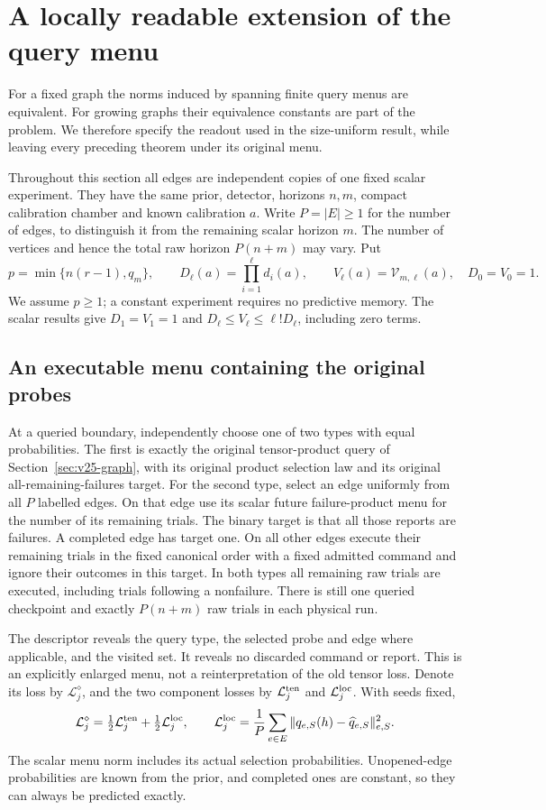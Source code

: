 \section{A locally readable extension of the query menu}
\label{sec:v28-readout}
For a fixed graph the norms induced by spanning finite query menus are
equivalent. For growing graphs their equivalence constants are part of
the problem. We therefore specify the readout used in the size-uniform
result, while leaving every preceding theorem under its original menu.

Throughout this section all edges are independent copies of one fixed
scalar experiment. They have the same prior, detector, horizons $n,m$,
compact calibration chamber and known calibration $a$. Write
$P=|E|\ge1$ for the number of edges, to distinguish it from the remaining
scalar horizon $m$. The number of vertices and hence the total raw
horizon $P(n+m)$ may vary. Put
\[
 p=\min\{n(r-1),q_m\},\qquad
 D_\ell(a)=\prod_{i=1}^{\ell}d_i(a),\qquad
 V_\ell(a)=\mathcal V_{m,\ell}(a),\quad D_0=V_0=1.
\]
We assume $p\ge1$; a constant experiment requires no predictive memory.
The scalar results give $D_1=V_1=1$ and
$D_\ell\le V_\ell\le\ell!D_\ell$, including zero terms.

\subsection{An executable menu containing the original probes}
At a queried boundary, independently choose one of two types with equal
probabilities. The first is exactly the original tensor-product query
of Section~\ref{sec:v25-graph}, with its original product selection law
and its original all-remaining-failures target. For the second type,
select an edge uniformly from all $P$ labelled edges. On that edge use
its scalar future failure-product menu for the number of its remaining
trials. The binary target is that all those reports are failures.
A completed edge has target one. On all other edges execute their
remaining trials in the fixed canonical order with a fixed admitted
command and ignore their outcomes in this target. In both types all
remaining raw trials are executed, including trials following a
nonfailure. There is still one queried checkpoint and exactly
$P(n+m)$ raw trials in each physical run.

The descriptor reveals the query type, the selected probe and edge
where applicable, and the visited set. It reveals no discarded command
or report. This is an explicitly enlarged menu, not a reinterpretation
of the old tensor loss. Denote its loss by $\mathcal L_j^\diamond$,
and the two component losses by $\mathcal L_j^{\rm ten}$ and
$\mathcal L_j^{\rm loc}$. With seeds fixed,
\begin{equation}\label{eq:v28-mixture-loss}
 \mathcal L_j^\diamond
   =\tfrac12\mathcal L_j^{\rm ten}
                    +\tfrac12\mathcal L_j^{\rm loc},\qquad
 \mathcal L_j^{\rm loc}
   =\frac1P\sum_{e\in E}
                    \|q_{e,S}(h)-\widehat q_{e,S}\|_{e,S}^2.
\end{equation}
The scalar menu norm includes its actual selection probabilities.
Unopened-edge probabilities are known from the prior, and completed
ones are constant, so they can always be predicted exactly.

